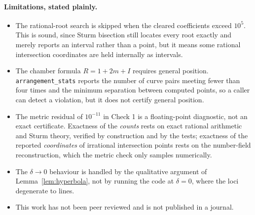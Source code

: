﻿\documentclass[11pt,a4paper]{article}
\theoremstyle{definition}
\theoremstyle{remark}
\begin{document}
\paragraph{Limitations, stated plainly.}
\begin{itemize}[leftmargin=*,itemsep=2pt]
\item The rational-root search is skipped when the cleared coefficients exceed
  $10^{5}$.  This is sound, since Sturm bisection still locates every root
  exactly and merely reports an interval rather than a point, but it means some
  rational intersection coordinates are held internally as intervals.
\item The chamber formula $R=1+2m+I$ requires general position.
  \texttt{arrangement\_stats} reports the number of curve pairs meeting fewer
  than four times and the minimum separation between computed points, so a
  caller can detect a violation, but it does not certify general position.
\item The metric residual of $10^{-11}$ in Check 1 is a floating-point
  diagnostic, not an exact certificate.  Exactness of the \emph{counts} rests on
  exact rational arithmetic and Sturm theory, verified by construction and by the
  tests; exactness of the reported \emph{coordinates} of irrational intersection
  points rests on the number-field reconstruction, which the metric check only
  samples numerically.
\item The $\delta\to0$ behaviour is handled by the qualitative argument of
  Lemma~\ref{lem:hyperbola}, not by running the code at $\delta=0$, where the loci
  degenerate to lines.
\item This work has not been peer reviewed and is not published in a journal.
\end{itemize}
\end{document}
